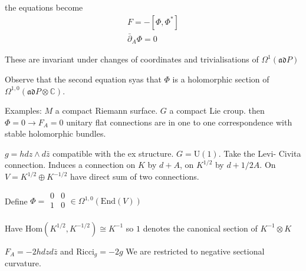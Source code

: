 the equations become 
\begin{align}
    F = - [ \Phi , \Phi^* ] \\
    \bar{\partial} _A \Phi = 0 
\end{align}

These are invariant under changes of coordinates and trivialisations of $ \Omega^1(\mathfrak{ad} P ) $

Observe that the second equation syas that $\Phi $ is a holomorphic section of $ \Omega^{1,0} ( \mathfrak{ad} P \otimes \mathbb{C}) $.

Examples: 
$ M $ a compact Riemann surface. 
$ G$ a compact Lie croup. 
then $ \Phi = 0 \rightarrow F_A = 0 $ unitary flat connections are in one to one correspondence with stable holomorphic bundles. 

$ g = h dz \wedge d \bar{z} $ compatible with the ex structure. 
$ G = \mathrm{U} ( 1) $. 
Take the Levi- Civita connection. 
Induces a connection on $K$ by $ d + A $, 
on $ K^{1/2} $ by $ d + 1/2 A $. 
On $ V = K^{1/2} \oplus K^{-1/2} $ have direct sum of two connections. 

Define $ \Phi = \begin{array}{rr}
    0 & 0 \\
    1 & 0 \\
\end{array} \in \Omega ^{1,0} ( \mathrm{End} (V) ) $ 

Have $ \mathrm{Hom} ( K^{1/2} , K^{-1/2} ) \cong K ^{-1} $ so $1$ denotes the canonical section of $ K^{-1} \otimes K $ 

$F_A = - 2h dz d \bar{z} $ and $ \mathrm{Ricci}_g = -2 g $ 
We are restricted to negative sectional curvature. 













 

